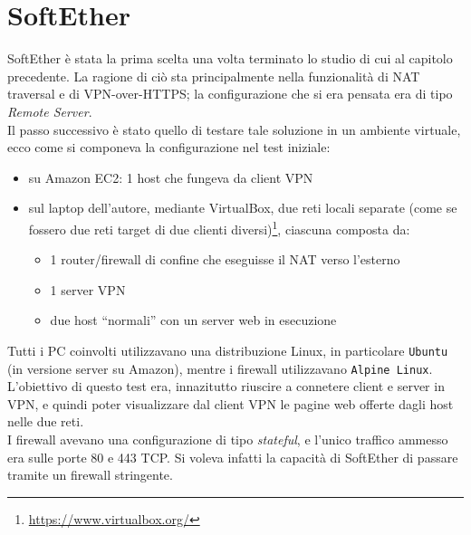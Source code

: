 \section{SoftEther}
SoftEther è stata la prima scelta una volta terminato lo studio di cui al
capitolo precedente. La ragione di ciò
sta principalmente nella funzionalità di NAT traversal e di VPN-over-HTTPS; la
configurazione che si era pensata era di tipo \textit{Remote Server}.\\
Il passo successivo è stato quello di testare tale soluzione in un ambiente virtuale,
ecco come si componeva la configurazione nel test
iniziale:
\begin{itemize}
  \item su Amazon EC2: 1 host che fungeva da client VPN
  \item sul laptop dell'autore, mediante VirtualBox, due reti locali separate (come
  se fossero due reti target di due clienti diversi)\footnote{\url{https://www.virtualbox.org/}}, ciascuna composta da:
  \begin{itemize}
    \item 1 router/firewall di confine che eseguisse il NAT verso l'esterno
    \item 1 server VPN
    \item due host ``normali'' con un server web in esecuzione
  \end{itemize}
\end{itemize}
Tutti i PC coinvolti utilizzavano una distribuzione Linux, in particolare \texttt{Ubuntu}
(in versione server su Amazon), mentre i firewall utilizzavano \texttt{Alpine Linux}.\\
L'obiettivo di questo test era, innazitutto riuscire a connetere client e server in
VPN, e quindi poter visualizzare dal client VPN le pagine web offerte dagli host
nelle due reti.\\
I firewall avevano una configurazione di tipo \textit{stateful}, e l'unico traffico
ammesso era sulle porte 80 e 443 TCP. Si voleva infatti la capacità di SoftEther di passare
tramite un firewall stringente.


